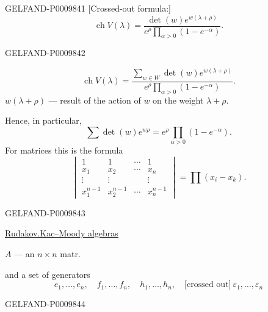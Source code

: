 \begin{GelfandAdjacentEvidence}{GELFAND-P000984}{1}
[Crossed-out formula:]
\[
\operatorname{ch}V(\lambda)=
\frac{\det(w)e^{w(\lambda+\rho)}}{e^\rho\prod_{\alpha>0}(1-e^{-\alpha})}.
\]
\end{GelfandAdjacentEvidence}
\begin{GelfandAdjacentEvidence}{GELFAND-P000984}{2}


\[
\operatorname{ch}V(\lambda)=
\frac{\displaystyle\sum_{w\in W}\det(w)e^{w(\lambda+\rho)}}
{e^\rho\displaystyle\prod_{\alpha>0}(1-e^{-\alpha})}.
\]
$w(\lambda+\rho)$ --- result of the action of $w$ on the weight $\lambda+\rho$.

Hence, in particular,
\[
\sum\det(w)e^{w\rho}=e^\rho\prod_{\alpha>0}(1-e^{-\alpha}).
\]
For matrices this is the formula
\[
\begin{vmatrix}
1&1&\cdots&1\\
x_1&x_2&\cdots&x_n\\
\vdots&\vdots&&\vdots\\
x_1^{n-1}&x_2^{n-1}&\cdots&x_n^{n-1}
\end{vmatrix}
=\prod(x_i-x_k).
\]
\end{GelfandAdjacentEvidence}
\begin{GelfandAdjacentEvidence}{GELFAND-P000984}{3}


\underline{Rudakov.}\qquad \underline{Kac–Moody algebras}

$A$ --- an $n\times n$ matr.

and a set of generators
\[
e_1,\ldots,e_n,\quad f_1,\ldots,f_n,\quad h_1,\ldots,h_n,\quad
\text{[crossed out]}\ \varepsilon_1,\ldots,\varepsilon_n
\]
\end{GelfandAdjacentEvidence}
\begin{GelfandAdjacentEvidence}{GELFAND-P000984}{4}


\end{GelfandAdjacentEvidence}


